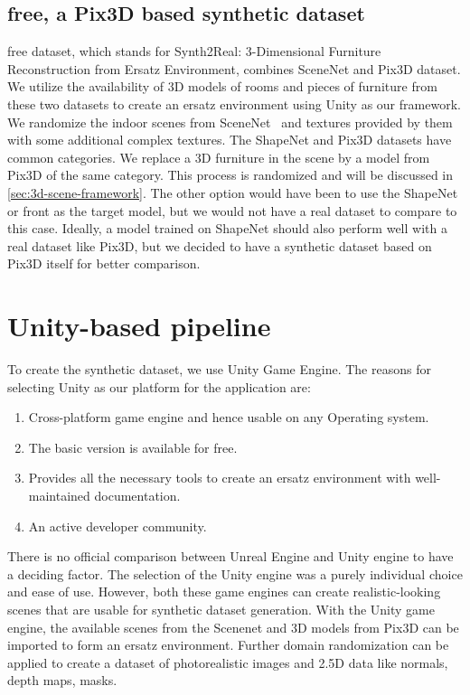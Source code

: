 \subsection{\gls{free}, a Pix3D based synthetic dataset}\label{sec:s2r:3d-free-a-pix3d-based-synthetic-dataset}

\gls{free} dataset, which stands for Synth2Real: 3-Dimensional Furniture Reconstruction from Ersatz Environment, combines SceneNet and Pix3D dataset.
We utilize the availability of 3D models of rooms and pieces of furniture from these two datasets to create an ersatz environment using Unity as our framework.
We randomize the indoor scenes from SceneNet~\cite{McCormac2017} and textures provided by them with some additional complex textures.
The ShapeNet and Pix3D datasets have common categories.
We replace a 3D furniture in the scene by a model from Pix3D of the same category.
This process is randomized and will be discussed in \autoref{sec:3d-scene-framework}.
The other option would have been to use the ShapeNet or \gls{front} as the target model, but we would not have a real dataset to compare to this case.
Ideally, a model trained on ShapeNet should also perform well with a real dataset like Pix3D, but we decided to have a synthetic dataset based on Pix3D itself for better comparison.

\section{Unity-based pipeline}\label{sec:unity-based-pipeline}
To create the synthetic dataset, we use Unity Game Engine.
The reasons for selecting Unity as our platform for the application are:
\begin{enumerate}
    \item Cross-platform game engine and hence usable on any Operating system.
    \item The basic version is available for free.
    \item Provides all the necessary tools to create an ersatz environment with well-maintained documentation.
    \item An active developer community.
\end{enumerate}

There is no official comparison between Unreal Engine and Unity engine to have a deciding factor.
The selection of the Unity engine was a purely individual choice and ease of use.
However, both these game engines can create realistic-looking scenes that are usable for synthetic dataset generation.
With the Unity game engine, the available scenes from the Scenenet and 3D models from Pix3D can be imported to form an ersatz environment.
Further domain randomization can be applied to create a dataset of photorealistic images and 2.5D data like normals, depth maps, masks.


